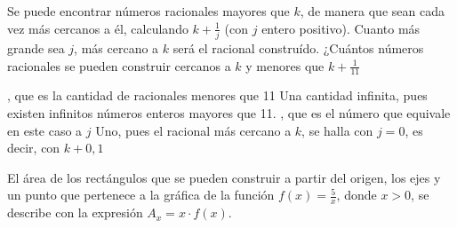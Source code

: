 \documentclass[10pt,addpoints]{exam}
\begin{document}
\begin{questions}
\begin{choices}
{}%
%
%
%
\end{choices}
\question Se puede encontrar números racionales mayores que $k$, de manera que sean cada vez más cercanos a él, calculando $k+\frac{1}{j}$ (con $j$ entero positivo). Cuanto más grande sea $j$, más cercano a $k$ será el racional construído. ¿Cuántos números racionales se pueden construir cercanos a $k$ y menores que $k+\frac{1}{11}$
\begin{choices}
 , que es la cantidad de racionales menores que 11
 \CorrectChoice Una cantidad infinita, pues existen infinitos números enteros mayores que 11.
 , que es el número que equivale en este caso a $j$
 \choice Uno, pues el racional más cercano a $k$, se halla con $j=0$, es decir, con $k+0,1$
\end{choices}
\begin{minipage}{.55\textwidth}
\question El área de los rectángulos que se pueden construir a partir del origen, los ejes y un punto que pertenece a la gráfica de la función $f(x)=\frac{5}{x}$, donde $x>0$, se describe con la expresión $A_{x}=x\cdot f(x)$.
\end{minipage}\hfill
\begin{minipage}{.4\textwidth}


\end{minipage}
\end{questions}
\end{document}
